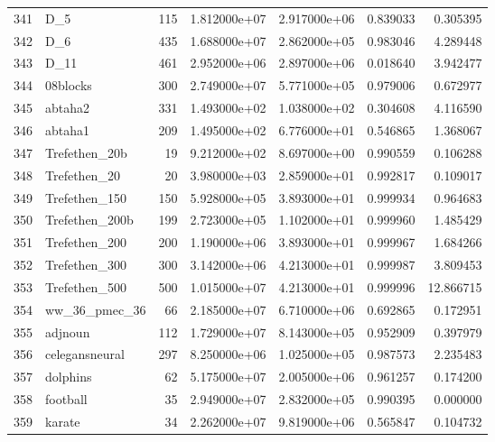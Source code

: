 \begin{tabular}{llrrrrr}
341 &                      D\_5 &   115 &  1.812000e+07 &  2.917000e+06 &  0.839033 &   0.305395 \\
342 &                      D\_6 &   435 &  1.688000e+07 &  2.862000e+05 &  0.983046 &   4.289448 \\
343 &                     D\_11 &   461 &  2.952000e+06 &  2.897000e+06 &  0.018640 &   3.942477 \\
344 &                 08blocks &   300 &  2.749000e+07 &  5.771000e+05 &  0.979006 &   0.672977 \\
345 &                  abtaha2 &   331 &  1.493000e+02 &  1.038000e+02 &  0.304608 &   4.116590 \\
346 &                  abtaha1 &   209 &  1.495000e+02 &  6.776000e+01 &  0.546865 &   1.368067 \\
347 &            Trefethen\_20b &    19 &  9.212000e+02 &  8.697000e+00 &  0.990559 &   0.106288 \\
348 &             Trefethen\_20 &    20 &  3.980000e+03 &  2.859000e+01 &  0.992817 &   0.109017 \\
349 &            Trefethen\_150 &   150 &  5.928000e+05 &  3.893000e+01 &  0.999934 &   0.964683 \\
350 &           Trefethen\_200b &   199 &  2.723000e+05 &  1.102000e+01 &  0.999960 &   1.485429 \\
351 &            Trefethen\_200 &   200 &  1.190000e+06 &  3.893000e+01 &  0.999967 &   1.684266 \\
352 &            Trefethen\_300 &   300 &  3.142000e+06 &  4.213000e+01 &  0.999987 &   3.809453 \\
353 &            Trefethen\_500 &   500 &  1.015000e+07 &  4.213000e+01 &  0.999996 &  12.866715 \\
354 &            ww\_36\_pmec\_36 &    66 &  2.185000e+07 &  6.710000e+06 &  0.692865 &   0.172951 \\
355 &                  adjnoun &   112 &  1.729000e+07 &  8.143000e+05 &  0.952909 &   0.397979 \\
356 &           celegansneural &   297 &  8.250000e+06 &  1.025000e+05 &  0.987573 &   2.235483 \\
357 &                 dolphins &    62 &  5.175000e+07 &  2.005000e+06 &  0.961257 &   0.174200 \\
358 &                 football &    35 &  2.949000e+07 &  2.832000e+05 &  0.990395 &   0.000000 \\
359 &                   karate &    34 &  2.262000e+07 &  9.819000e+06 &  0.565847 &   0.104732 \\

\end{tabular}
